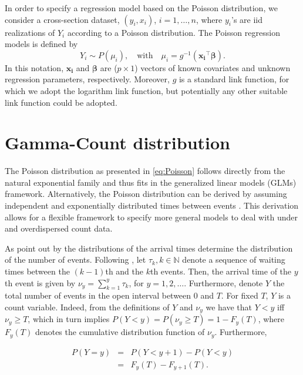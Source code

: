 \documentclass[9pt,a5paper,]{book}
\theoremstyle{definition}
\theoremstyle{definition}
\theoremstyle{remark}
\begin{document}
In order to specify a regression model based on the Poisson
distribution, we consider a cross-section dataset, \((y_i, x_i)\),
\(i = 1,\ldots, n\), where \(y_i\)'s are iid realizations of \(Y_i\)
according to a Poisson distribution. The Poisson regression models is
defined by
\[Y_i \sim P(\mu_i), \quad  \text{with} \quad \mu_i = g^{-1}(\boldsymbol{x_i}^{\top} \boldsymbol{\beta}).\]
In this notation, \(\boldsymbol{x_i}\) and \(\boldsymbol{\beta}\) are
(\(p \times 1\)) vectors of known covariates and unknown regression
parameters, respectively. Moreover, \(g\) is a standard link function,
for which we adopt the logarithm link function, but potentially any
other suitable link function could be adopted.

\section{Gamma-Count distribution}\label{gammacount}

The Poisson distribution as presented in \eqref{eq:Poisson} follows
directly from the natural exponential family and thus fits in the
generalized linear models (GLMs) framework. Alternatively, the Poisson
distribution can be derived by assuming independent and exponentially
distributed times between events \citep{Zeviani2014}. This derivation
allows for a flexible framework to specify more general models to deal
with under and overdispersed count data.

As point out by \citet{Winkelmann2003} the distributions of the arrival
times determine the distribution of the number of events. Following
\citet{Winkelman1995}, let \({\tau_k, k \in \mathbb{N}}\) denote a
sequence of waiting times between the \((k-1)\)th and the \(k\)th
events. Then, the arrival time of the \(y\)th event is given by
\(\nu_y = \sum_{k = 1}^{y} \tau_k\), for \(y = 1, 2, \ldots\).
Furthermore, denote \(Y\) the total number of events in the open
interval between \(0\) and \(T\). For fixed \(T\), \(Y\) is a count
variable. Indeed, from the definitions of \(Y\) and \(\nu_y\) we have
that \(Y < y\) iff \(\nu_y \ge T\), which in turn implies
\(P(Y < y) = P(\nu_y \ge T) = 1 - F_y(T)\), where \(F_y(T)\) denotes the
cumulative distribution function of \(\nu_y\). Furthermore,

\begin{eqnarray}
P(Y = y) &=& P(Y < y+1) - P(Y < y) \nonumber \\
     &=& F_y(T) - F_{y+1}(T).
\label{eq:DURATION}
\end{eqnarray}
\end{document}

